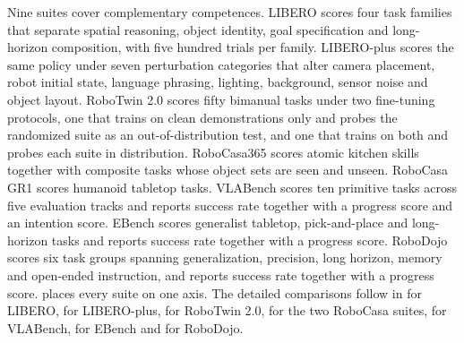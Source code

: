 Nine suites cover complementary competences. LIBERO scores four task families
that separate spatial reasoning, object identity, goal specification and
long-horizon composition, with five hundred trials per family. LIBERO-plus
scores the same policy under seven perturbation categories that alter camera
placement, robot initial state, language phrasing, lighting, background, sensor
noise and object layout. RoboTwin 2.0 scores fifty bimanual tasks under two
fine-tuning protocols, one that trains on clean demonstrations only and probes
the randomized suite as an out-of-distribution test, and one that trains on both
and probes each suite in distribution. RoboCasa365 scores atomic kitchen skills
together with composite tasks whose object sets are seen and unseen. RoboCasa GR1
scores humanoid tabletop tasks. VLABench scores ten primitive tasks across five
evaluation tracks and reports success rate together with a progress score and an
intention score. EBench scores generalist tabletop, pick-and-place and
long-horizon tasks and reports success rate together with a progress score.
RoboDojo scores six task groups spanning generalization, precision, long horizon,
memory and open-ended instruction, and reports success rate together with a
progress score.
 places every suite on one axis. The detailed comparisons follow
in  for LIBERO,  for LIBERO-plus,
 for RoboTwin 2.0,  for the two RoboCasa
suites,  for VLABench,  for EBench and
 for RoboDojo.


